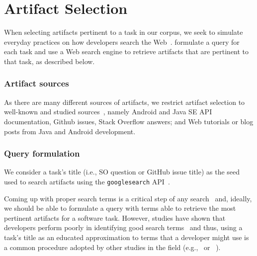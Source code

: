 
\section{Artifact Selection}
\label{cp4:corpus-artifacts}


When selecting artifacts pertinent to a task in our corpus, we seek to simulate everyday practices on how developers search the Web~\cite{rao2020, Xia2017}.
formulate a query for each task and use a Web search engine to retrieve artifacts that are pertinent to that task, as described below.


\subsubsection{Artifact sources}


As there are many different sources of artifacts, we restrict artifact selection to well-known and studied sources~\cite{Starke2009,Kevic2014, Li2013}, namely
Android and Java SE API documentation, Github issues, Stack Overflow answers; and Web tutorials or blog posts from Java and Android development.



\subsubsection{Query formulation}



We consider a task's title (i.e., SO  question or GitHub issue title) as the seed used to search artifacts
using the \texttt{googlesearch} API~\cite{googlesearch}. 


Coming up with proper search terms is a critical step of any search~\cite{Haiduc2013}
and, ideally, we should be able to formulate a query with terms able to retrieve the most pertinent artifacts for a software task.
However, studies have shown that developers perform poorly in identifying good search terms~\cite{Starke2009,Kevic2014, Li2013} and thus, using a task's title
as an educated approximation to terms that a developer might use is a common procedure adopted by other studies in the field (e.g.,~\cite{Xu2017} or ~\cite{Silva2019}).







